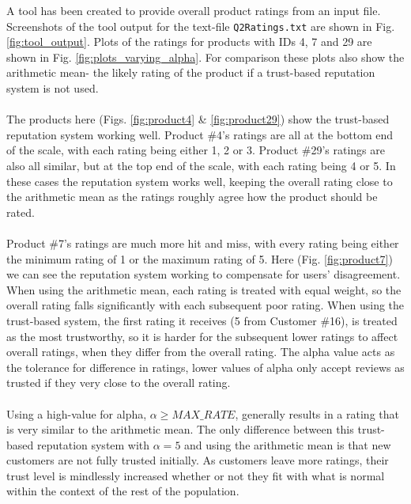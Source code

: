 \documentclass{article}
\begin{document}
A tool has been created to provide overall product ratings from an input file. Screenshots of the tool output for the text-file \texttt{Q2Ratings.txt} are shown in Fig. \ref{fig:tool_output}.
Plots of the ratings for products with IDs 4, 7 and 29 are shown in Fig. \ref{fig:plots_varying_alpha}. For comparison these plots also show the arithmetic mean- the likely rating of the product if a trust-based reputation system is not used.
\\\\
The products here (Figs. \ref{fig:product4} \& \ref{fig:product29}) show the trust-based reputation system working well.
Product \#4's ratings are all at the bottom end of the scale, with each rating being either 1, 2 or 3. 
Product \#29's ratings are also all similar, but at the top end of the scale, with each rating being 4 or 5.
In these cases the reputation system works well, keeping the overall rating close to the arithmetic mean as the ratings roughly agree how the product should be rated.
\\\\
Product \#7's ratings are much more hit and miss, with every rating being either the minimum rating of 1 or the maximum rating of 5.
Here (Fig. \ref{fig:product7}) we can see the reputation system working to compensate for users' disagreement.
When using the arithmetic mean, each rating is treated with equal weight, so the overall rating falls significantly with each subsequent poor rating.
When using the trust-based system, the first rating it receives (5 from Customer \#16), is treated as the most trustworthy, so it is harder for the subsequent lower ratings to affect overall ratings, when they differ from the overall rating.
The alpha value acts as the tolerance for difference in ratings, lower values of alpha only accept reviews as trusted if they very close to the overall rating.
\\\\
Using a high-value for alpha, $\alpha \geqslant MAX\_RATE$, generally results in a rating that is very similar to the arithmetic mean. The only difference between this trust-based reputation system with $\alpha = 5$ and using the arithmetic mean is that new customers are not fully trusted initially. As customers leave more ratings, their trust level is mindlessly increased whether or not they fit with what is normal within the context of the rest of the population.
\end{document}
